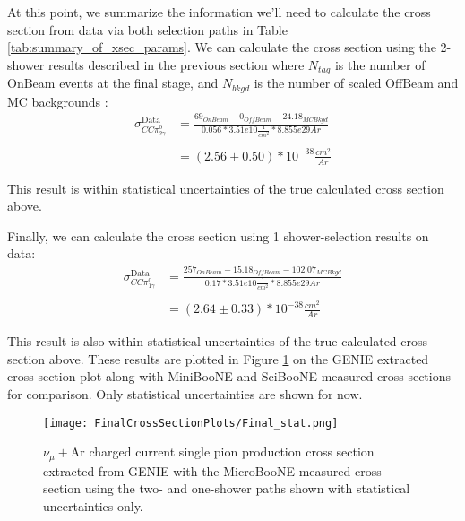 \documentclass{article}
\begin{document}

\par At this point, we summarize the information we'll need to calculate the cross section from data via both selection paths in Table \ref{tab:summary_of_xsec_params}. We can calculate the cross section using the 2-shower results described in the previous section where $N_{tag}$ is the number of OnBeam events at the final stage, and $N_{bkgd}$ is the number of scaled OffBeam and MC backgrounds :
\begin{align}
\sigma^{\text{Data}}_{CC\pi^0_{2\gamma}} &= \frac{69_{OnBeam} - 0_{OffBeam} - 24.18_{MCBkgd}}{0.056 * 3.51e10 \frac{1}{cm^2} * 8.855e29 Ar} \\\\
&= (2.56 \pm 0.50) *10^{-38} \frac{cm^2}{Ar}
\end{align}

This result is within statistical uncertainties of the true calculated cross section above. 

\par Finally, we can calculate the cross section using 1 shower-selection results on data:
\begin{align}
\sigma^{\text{Data}}_{CC\pi^0_{1\gamma}} &= \frac{257_{OnBeam} - 15.18_{OffBeam} - 102.07_{MCBkgd}}{0.17 * 3.51e10 \frac{1}{cm^2} * 8.855e29 Ar} \\\\
&= (2.64 \pm 0.33) *10^{-38} \frac{cm^2}{Ar}
\end{align}

This result is also within statistical uncertainties of the true calculated cross section above. These results are plotted in Figure \ref{fig:genie_uboone_xsec} on the GENIE extracted cross section plot along with MiniBooNE and SciBooNE measured cross sections for comparison.  Only statistical uncertainties are shown for now.

\begin{figure}[h!]
\centering
\texttt{[image: FinalCrossSectionPlots/Final\_stat.png]}
\caption{ $\nu_{\mu}+\text{Ar}$ charged current single pion production cross section extracted from GENIE with the MicroBooNE measured cross section using the two- and one-shower paths shown with statistical uncertainties only. }
\label{fig:genie_uboone_xsec}
\end{figure}
\end{document}
